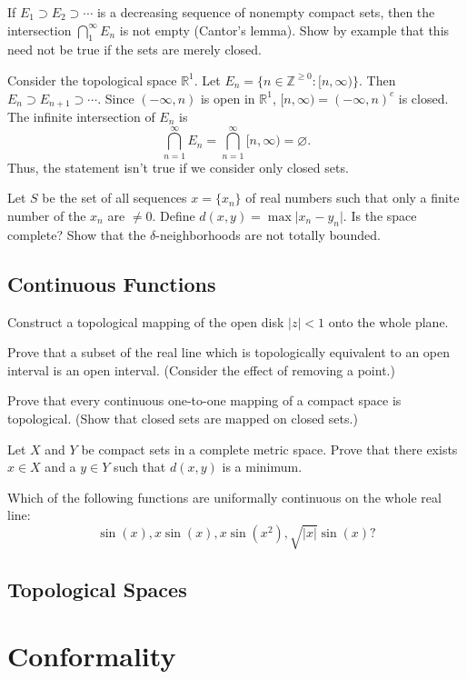 \begin{exercise}
\item
  If \(E_1\supset E_2\supset\cdots\) is a decreasing sequence of nonempty
  compact sets, then the intersection \(\bigcap_1^{\infty}E_n\) is not empty
  (Cantor's lemma).
  Show by example that this need not be true if the sets are merely closed.
  \par\smallskip
  Consider the topological space \(\mathbb{R}^1\).
  Let \(E_n = \{n\in\mathbb{Z}^{\geq 0}\colon [n,\infty)\}\).
  Then \(E_n\supset E_{n + 1}\supset\cdots\).
  Since \((-\infty,n)\) is open in \(\mathbb{R}^1\),
  \([n,\infty) = (-\infty,n)^c\) is closed.
  The infinite intersection of \(E_n\) is
  \[
    \bigcap_{n = 1}^{\infty}E_n = \bigcap_{n = 1}^{\infty}[n, \infty) =
    \varnothing.
  \]
  Thus, the statement isn't true if we consider only closed sets.
\item
  Let \(S\) be the set of all sequences \(x = \{x_n\}\) of real numbers such
  that only a finite number of the \(x_n\) are \(\neq 0\).
  Define \(d(x,y) = \max\lvert x_n - y_n\rvert\).
  Is the space complete?
  Show that the \(\delta\)-neighborhoods are not totally bounded.
\end{exercise}

\subsection{Continuous Functions}

\begin{exercise}
\item
  Construct a topological mapping of the open disk \(\lvert z\rvert < 1\) onto
  the whole plane.
\item
  Prove that a subset of the real line which is topologically equivalent to an
  open interval is an open interval.
  (Consider the effect of removing a point.)
\item
  Prove that every continuous one-to-one mapping of a compact space is
  topological.
  (Show that closed sets are mapped on closed sets.)
\item
  Let \(X\) and \(Y\) be compact sets in a complete metric space.
  Prove that there exists \(x\in X\) and a \(y\in Y\) such that
  \(d(x,y)\) is a minimum.
\item
  Which of the following functions are uniformally continuous on the whole
  real line:
  \[
    \sin(x),x\sin(x),x\sin(x^2),\sqrt{\lvert x\rvert}\sin(x)\mbox{?}
  \]
\end{exercise}

\subsection{Topological Spaces}

\section{Conformality}

